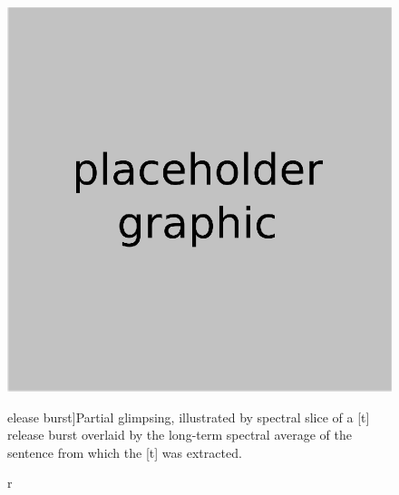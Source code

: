 \begin{figure}[htbp]
	\begin{centering}
	\includegraphics{xxx.eps}
	\caption[Partial glimpsing of a [t] release burst]{Partial glimpsing, illustrated by spectral slice of a [t] release burst overlaid by the long-term spectral average of the sentence from which the [t] was extracted.\label{fig:ReleaseBurstGlimpse}}
	\end{centering}
\end{figure}


